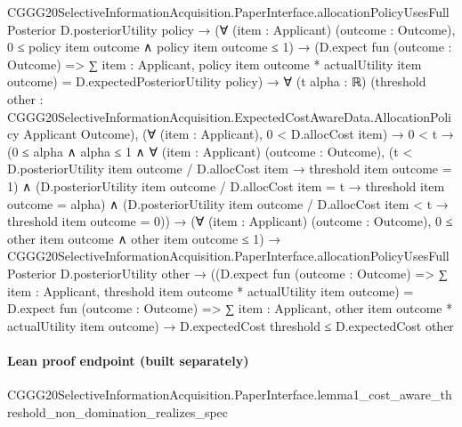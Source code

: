 \documentclass[10pt]{article}
\begin{document}
\begin{ReviewVerbatim}
        CGGG20SelectiveInformationAcquisition.PaperInterface.allocationPolicyUsesFullPosterior D.posteriorUtility
            policy →
          (∀ (item : Applicant) (outcome : Outcome), 0 ≤ policy item outcome ∧ policy item outcome ≤ 1) →
            (D.expect fun (outcome : Outcome) => ∑ item : Applicant, policy item outcome * actualUtility item outcome) =
              D.expectedPosteriorUtility policy) →
      ∀ (t alpha : ℝ)
        (threshold other :
          CGGG20SelectiveInformationAcquisition.ExpectedCostAwareData.AllocationPolicy Applicant Outcome),
        (∀ (item : Applicant), 0 < D.allocCost item) →
          0 < t →
            (0 ≤ alpha ∧
                alpha ≤ 1 ∧
                  ∀ (item : Applicant) (outcome : Outcome),
                    (t < D.posteriorUtility item outcome / D.allocCost item → threshold item outcome = 1) ∧
                      (D.posteriorUtility item outcome / D.allocCost item = t → threshold item outcome = alpha) ∧
                        (D.posteriorUtility item outcome / D.allocCost item < t → threshold item outcome = 0)) →
              (∀ (item : Applicant) (outcome : Outcome), 0 ≤ other item outcome ∧ other item outcome ≤ 1) →
                CGGG20SelectiveInformationAcquisition.PaperInterface.allocationPolicyUsesFullPosterior
                    D.posteriorUtility other →
                  ((D.expect fun (outcome : Outcome) =>
                        ∑ item : Applicant, threshold item outcome * actualUtility item outcome) =
                      D.expect fun (outcome : Outcome) =>
                        ∑ item : Applicant, other item outcome * actualUtility item outcome) →
                    D.expectedCost threshold ≤ D.expectedCost other
\end{ReviewVerbatim}

\paragraph{Lean proof endpoint (built separately)}\begin{ReviewVerbatim}
CGGG20SelectiveInformationAcquisition.PaperInterface.lemma1_cost_aware_threshold_non_domination_realizes_spec
\end{ReviewVerbatim}
\end{document}

